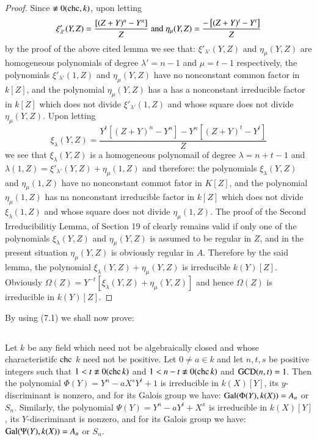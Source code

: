 \begin{proof}
Since $\nequiv 0(\chc, k)$, upon letting
$$
\xi'_{\lambda'}(Y,Z)=\dfrac{\left[(Z+Y)^n-Y^{n}\right]}{Z} \; {\rm and}\; \eta_{\mu}(Y,Z)=\dfrac{-\left[(Z+Y)^t-Y^{t}\right]}{Z}
$$
by the proof of the above cited lemma we see that: $\xi'_{\lambda'}(Y,Z)$ and $\eta_{\mu}(Y,Z)$ are homogeneous polynomials of degree $\lambda'=n-1$ and $\mu = t-1$ respectively, the polynomials $\xi'_{\lambda'}(1,Z)$ and $\eta_{\mu}(Y,Z)$ have no nonconstant common factor in $k[Z]$, and the polynomial $\eta_{\mu}(Y,Z)$ has a has a nonconstant irreducible factor in $k[Z]$ which does not divide $\xi'_{\lambda'}(1,Z)$ and whose square does not divide $\eta_{\mu}(Y,Z)$. Upon letting 
$$
\xi_{\lambda}(Y,Z)=\dfrac{Y^{t}\left[(Z+Y)^{n}-Y^{n}\right]-Y^{n}\left[(Z+Y)^{t}-Y^{t}\right]}{Z}
$$
we see that $\xi_{\lambda}(Y,Z)$ is a homogeneous polynomail of degree $\lambda =n+t-1$ and $\lambda(1,Z)= \xi'_{\lambda'}(Y,Z)+\eta_{\mu}(1,Z)$ and therefore: the polynomials $\xi_{\lambda}(Y,Z)$ and $\eta_{\mu}(1,Z)$ have no  nonconstant commot fator in $K[Z]$, and the polynomial $\eta_{\mu}(1,Z)$ has na nonconstant irreducible factor in $k[Z]$ which does not divide $\xi_{\lambda}(1,Z)$ and whose square does not divide $\eta_{\mu}(1,Z)$. The proof of the Second Irreducibilitiy Lemma, of Section 19 of \cite{art1-key8} clearly remains valid if only one of the polynomials $\xi_{\lambda}(Y,Z)$ and $\eta_{\mu}(Y,Z)$ is assumed to be regular in $Z$, and in the present situation $\eta_{\mu}(Y,Z)$ is obviously regular in $A$. Therefore by the said lemma, the polynomial $\xi_{\lambda}(Y,Z) + \eta_{\mu}(Y,Z)$  is irreducible $k(Y)[Z]$. Obviously $\Omega(Z)=Y^{-t}\left[\xi_{\lambda}(Y,Z) + \eta_{\mu}(Y,Z)\right]$ and hence $\Omega(Z)$ is irreducible in $k(Y)[Z]$.
\end{proof}
By using (7.1) we shall now prove:

\subsection{}

Let $k$ be any field which need not be algebraically closed and whose characteristifc $\operatorname{chc}$ $k$  need not be positive. Let $0 \neq a\in k$ and let $n, t, s$ be positive integers such that $1 < t\nequiv 0(\chc k)$ and $1 < n-t \nequiv 0(\chc k)$ and $\operatorname{GCD}(n, t) =1$. Then the polynomial $\Phi(Y)=Y^{n}-aX^{s}Y^{t}+1$ is irreducible in $k(X)[Y]$, its $y$-discriminant is nonzero, and for its Galois group we have: $\operatorname{Gal}(\Phi(Y), k(X))=A_{n}$ or $S_{n}$. Similarly, the polynomial $\Psi(Y)=Y^{n}-aY^{t}+X^{x}$ is irreducible in $k(X)[Y]$, its $Y$-discriminant is nonzero, and for its Galois group we have: $\operatorname{Gal}(\Psi(Y), k(X))=A_{n}$ or $S_{n}$.

